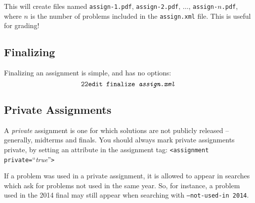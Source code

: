     This will create files named \texttt{assign-1.pdf}, \texttt{assign-2.pdf},
    $\ldots$, \texttt{assign-$n$.pdf}, where $n$ is the number of problems
    included in the \texttt{assign.xml} file. This is useful for grading!
    
  \subsection{Finalizing}
    Finalizing an assignment is simple, and has no options:
    \[\texttt{22edit }\texttt{finalize \textit{assign.xml}}\]
    
  \subsection{Private Assignments}
    A \textit{private} assignment is one for which solutions are not publicly
    released -- generally, midterms and finals. You should always mark
    private assignments private, by setting an attribute in the assignment tag: 
    \texttt{<assignment private=}``\textit{true}''\texttt{>}
    
    If a problem was used in a private assignment, it is allowed to appear
    in searches which ask for problems not used in the same year. So, for
    instance, a problem used in the 2014 final may still appear when
    searching with \texttt{--not-used-in 2014}. 